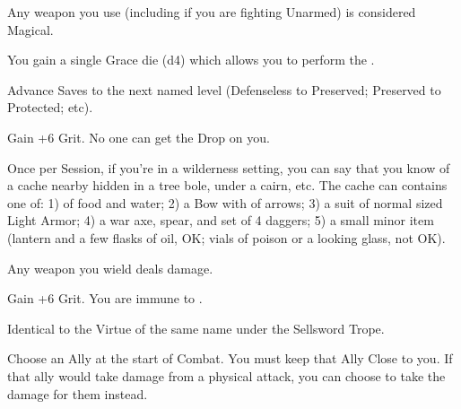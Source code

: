 \begin{multicols*}{2}

Any weapon you use (including if you are fighting Unarmed) is considered Magical.


You gain a single Grace die (d4) which allows you to perform the .


Advance  Saves to the next named level (Defenseless to Preserved; Preserved to Protected; etc).


Gain +6 \MAX Grit. No one can get the Drop on you.  


Once per Session, if you're in a wilderness setting, you can say that you know of a cache nearby hidden in a tree bole, under a cairn, etc.  The cache can contains one of: 1)  of food and water; 2) a Bow with  of arrows; 3) a suit of normal sized Light Armor; 4) a war axe, spear, and set of 4 daggers; 5) a small minor item (lantern and a few flasks of oil, OK; vials of poison or a looking glass, not OK).


Any \VIG weapon you wield deals \DCUP damage.


Gain +6 \MAX Grit. You are immune to .  



Identical to the Virtue of the same name under the Sellsword Trope.


\cbreak



Choose an Ally at the start of Combat.  You must keep that Ally Close to you. If that ally would take damage from a physical attack, you can choose to take the damage for them instead.

\end{multicols*}



